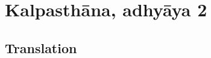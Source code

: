 \newcommand{\plant}[4]{#1 (\emph{#2})\footnoteA{#3; see #4}}
\let\chemical = \plant
\newcommand{\skt}[2]{#1 (\emph{#2})}
\newcommand{\sskt}[2]{\empty}
%
\newcommand{\diff}[1]{\textcolor{red}{#1}}

\section{Kalpasthāna, adhyāya 2}


\subsection{Translation}

